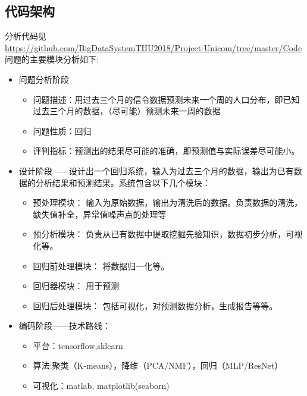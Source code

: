 \subsection{代码架构}
分析代码见 \\ \url{https://github.com/BigDataSystemTHU2018/Project-Unicom/tree/master/Code}
问题的主要模块分析如下:
\begin{itemize}
	\item 问题分析阶段
		\begin{itemize}
			\item 问题描述：用过去三个月的信令数据预测未来一个周的人口分布，即已知过去三个月的数据，（尽可能）预测未来一周的数据
			\item 问题性质：回归
			\item 评判指标：预测出的结果尽可能的准确，即预测值与实际误差尽可能小。
		\end{itemize}
	\item 设计阶段——设计出一个回归系统，输入为过去三个月的数据，输出为已有数据的分析结果和预测结果。系统包含以下几个模块：
		\begin{itemize}
			\item 预处理模块：
			输入为原始数据，输出为清洗后的数据。负责数据的清洗，缺失值补全，异常值噪声点的处理等
			\item 预分析模块：
			负责从已有数据中提取挖掘先验知识，数据初步分析，可视化等。
			\item 回归前处理模块：
			将数据归一化等。
			\item 回归器模块：
			用于预测
			\item 回归后处理模块：
			包括可视化，对预测数据分析，生成报告等等。
		\end{itemize}
	\item 编码阶段——技术路线：
		\begin{itemize}
			\item 平台：tensorflow,sklearn
			\item 算法:聚类（K-means），降维（PCA/NMF），回归（MLP/ResNet）
			\item 可视化：matlab, matplotlib(seaborn)
		\end{itemize}
\end{itemize}
